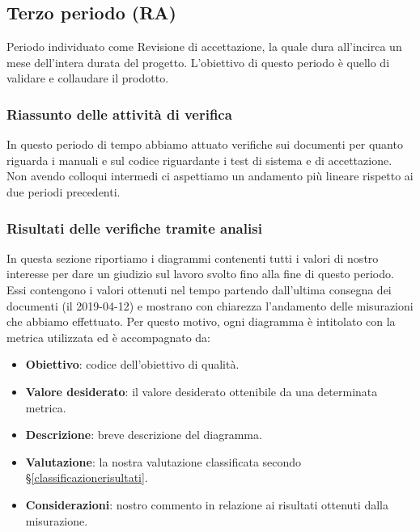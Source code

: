 	\subsection{Terzo periodo (RA)}\label{QuartoPeridodoRQ}
	Periodo individuato come Revisione di accettazione, la quale dura all'incirca un mese dell'intera durata
	del progetto. L'obiettivo di questo periodo è quello di validare e collaudare il prodotto.
	
	\subsubsection{Riassunto delle attività di verifica}
	In questo periodo di tempo abbiamo attuato verifiche sui documenti per quanto riguarda i manuali e sul codice riguardante i test di sistema e di accettazione. Non avendo colloqui intermedi ci aspettiamo un andamento più lineare rispetto ai due periodi precedenti.
	
	\subsubsection{Risultati delle verifiche tramite analisi}
	In questa sezione riportiamo i diagrammi contenenti tutti i valori di nostro interesse per dare un giudizio sul lavoro svolto fino alla fine di questo periodo.
	Essi contengono i valori ottenuti nel tempo partendo dall'ultima consegna dei documenti (il 2019-04-12) e mostrano con chiarezza l'andamento delle misurazioni che abbiamo effettuato.
	Per questo motivo, ogni diagramma è intitolato con la metrica utilizzata ed è accompagnato da:
	\begin{itemize}
		\item \textbf{Obiettivo}: codice dell'obiettivo di qualità.
		\item \textbf{Valore desiderato}: il valore desiderato ottenibile da una determinata metrica.
		\item \textbf{Descrizione}: breve descrizione del diagramma.
		\item \textbf{Valutazione}: la nostra valutazione classificata secondo \S\ref{classificazionerisultati}.
		\item \textbf{Considerazioni}: nostro commento in relazione ai risultati ottenuti dalla misurazione.
	\end{itemize}